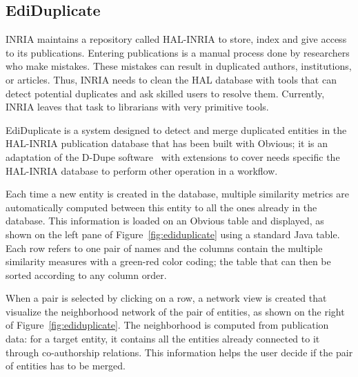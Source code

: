 \subsection{EdiDuplicate}

INRIA maintains a repository called
HAL-INRIA\cite{HAL} to store, index and give
access to its publications.  Entering publications is a manual process
done by researchers who make mistakes.  These mistakes can result in
duplicated authors, institutions, or articles. Thus, INRIA needs to
clean the HAL database with tools that can detect potential duplicates
and ask skilled users to resolve them.  Currently, INRIA leaves that
task to librarians with very primitive tools.

EdiDuplicate is a system designed to detect and merge duplicated
entities in the HAL-INRIA publication database that has been built
with Obvious; it is an adaptation of the D-Dupe software~\cite{DDupe}
with extensions to cover needs specific the HAL-INRIA
database\cite{HAL} to perform other operation in a workflow.

Each time a new entity is created in the database, multiple similarity
metrics are automatically computed between this entity to all the ones
already in the database.  This information is loaded on an Obvious
table and displayed, as shown on the left pane of
Figure~\ref{fig:ediduplicate} using a standard Java table.  Each row
refers to one pair of names and the columns contain the multiple
similarity measures with a green-red color coding; the table that can
then be sorted according to any column order.

When a pair is selected by clicking on a row, a network view is created
that visualize the neighborhood network of the pair of entities, as
shown on the right of Figure~\ref{fig:ediduplicate}.  The
neighborhood is computed from publication data: for a target entity,
it contains all the entities already connected to it through
co-authorship relations.  This information helps the user decide if
the pair of entities has to be merged.

